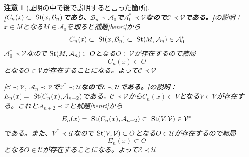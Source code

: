 \documentclass[leqno]{jsarticle}
\newtheorem*{cau}{注意}
\newcommand{\uu}{\mathcal{U}}
\newcommand{\vv}{\mathcal{V}}
\newcommand{\A}{\mathcal{A}}
\newcommand{\B}{\mathcal{B}}
\newcommand{\s}{\text{  {\rm St}} }
\newcommand{\C}{\mathcal{C}}
\newcommand{\E}{\mathcal{E}}
\newcommand{\pr}{\prec}
\begin{document}
\begin{cau}[証明の中で後で説明すると言った箇所]${}$\\
{\bf [$C_n(x)\subset \s(x,\B_{n})$であり、$\B_n\pr \A_0$で$\A_0^{*}\pr \vv$なので$\C\pr\vv$である。]}の説明：$x\in M$となる$M\in \A_0$を取ると補題\ref{benri}から
\[
C_n(x)\subset \s(x,\B_{n})\subset \s(M,\A_n)\in \A_0^{*}
\]
$\A_0^{*}\pr\vv$なので$\s(M,\A_n)\subset O$となる$O\in \vv$が存在するので結局
\[
C_n(x)\subset O
\]
となる$O\in \vv$が存在することになる。よって$\C\pr \vv$


{\bf [$\C\pr \vv,\ \A_n\pr \vv$で$\vv^{*}\pr\uu$なので$\mathcal{E}\pr \uu$である。]}の説明：
$E_n(x)=\s(C_n(x),\A_{n+2})$である。$\C\pr \vv$から$C_n(x)\subset V$となる$V\in \vv$が存在する。これと$\A_{n+2}\pr \vv$と補題\ref{benri}から
\[
E_n(x)=\s(C_n(x),\A_{n+2})\subset \s(V,\vv)\in \vv^{*}
\]
である。また、$\vv^{*}\pr \uu$なので$\s(V,\vv)\subset O$となる$O\in \uu$が存在するので結局
\[
E_n(x)\subset O
\]
となる$O\in \uu$が存在することになる。よって$\E\pr \uu$
\end{cau}

\end{document}
